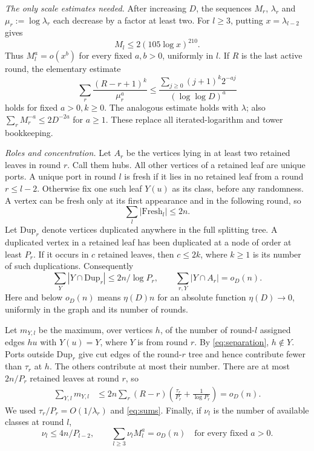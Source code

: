 \documentclass[11pt]{article}
\theoremstyle{remark}\newtheorem*{remark}{Remark}
\begin{document}
\emph{The only scale estimates needed.}
After increasing $D$, the sequences $M_r$, $\lambda_r$ and
$\mu_r:=\log\lambda_r$ each decrease by a factor at least two.
For $l\ge3$, putting $x=\lambda_{l-2}$ gives
\begin{equation}\label{eq:tworound}
 M_l\le2(105\log x)^{210}.
\end{equation}
Thus $M_l^a=o(x^b)$ for every fixed $a,b>0$, uniformly in $l$.
If $R$ is the last active round, the elementary estimate
\begin{equation}\label{eq:sums}
 \sum_r\frac{(R-r+1)^k}{\mu_r^a}
 \le\frac{\sum_{j\ge0}(j+1)^k2^{-aj}}{(\log\log D)^a}
\end{equation}
holds for fixed $a>0,k\ge0$. The analogous estimate holds with $\lambda$;
also $\sum_r M_r^{-a}\le2D^{-2a}$ for $a\ge1$.
These replace all iterated-logarithm and tower bookkeeping.

\emph{Roles and concentration.}
Let $A_r$ be the vertices lying in at least two retained leaves in round
$r$. Call them hubs. All other vertices of a retained leaf are unique
ports. A unique port in round $l$ is fresh if it lies in no retained
leaf from a round $r\le l-2$. Otherwise fix one such leaf $Y(u)$ as
its class, before any randomness. A vertex can be fresh only at its
first appearance and in the following round, so
\begin{equation}\label{eq:fresh}
 \sum_l|\mathrm{Fresh}_l|\le2n.
\end{equation}
Let $\mathrm{Dup}_r$ denote vertices duplicated anywhere in the full
splitting tree. A duplicated vertex in a retained leaf has been
duplicated at a node of order at least $P_r$. If it occurs in $c$
retained leaves, then $c\le2k$, where $k\ge1$ is its number of such
duplications. Consequently
\begin{equation}\label{eq:hub}
 \sum_Y|Y\cap\mathrm{Dup}_r|\le2n/\log P_r,
 \qquad \sum_{r,Y}|Y\cap A_r|=o_D(n).
\end{equation}
Here and below $o_D(n)$ means $\eta(D)n$ for an absolute function
$\eta(D)\to0$, uniformly in the graph and its number of rounds.

Let $m_{Y,l}$ be the maximum, over vertices $h$, of the number of
round-$l$ assigned edges $hu$ with $Y(u)=Y$, where $Y$ is from round $r$.
By \eqref{eq:separation}, $h\notin Y$. Ports outside $\mathrm{Dup}_r$
give cut edges of the round-$r$ tree and hence contribute fewer than
$\tau_r$ at $h$. The others contribute at most their number.
There are at most $2n/P_r$ retained leaves at round $r$, so
\begin{align}\label{eq:concentration}
 \sum_{Y,l}m_{Y,l}
 &\le2n\sum_r(R-r)\left(\frac{\tau_r}{P_r}
                         +\frac1{\log P_r}\right)=o_D(n).
\end{align}
We used $\tau_r/P_r=O(1/\lambda_r)$ and \eqref{eq:sums}.
Finally, if $\nu_l$ is the number of available classes at round $l$,
\begin{equation}\label{eq:ancestors}
 \nu_l\le4n/P_{l-2},\qquad
 \sum_{l\ge3}\nu_l M_l^a=o_D(n)\quad\text{for every fixed }a>0.
\end{equation}
\end{document}
